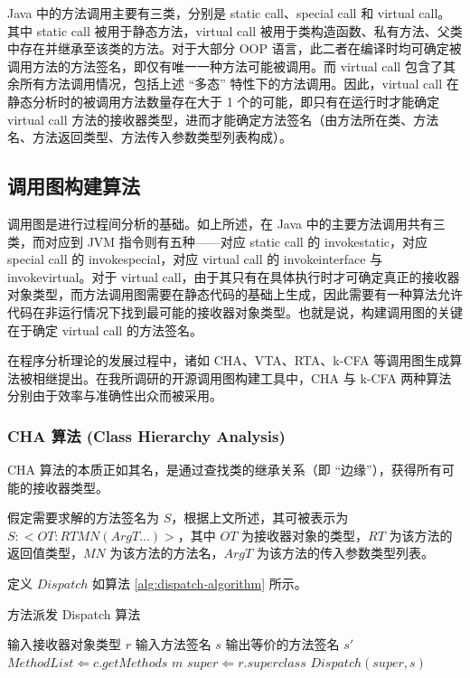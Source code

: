 Java 中的方法调用主要有三类，分别是 static call、special call 和 virtual call。其中 static call 被用于静态方法，virtual call 被用于类构造函数、私有方法、父类中存在并继承至该类的方法。对于大部分 OOP 语言，此二者在编译时均可确定被调用方法的方法签名，即仅有唯一一种方法可能被调用。而 virtual call 包含了其余所有方法调用情况，包括上述 “多态” 特性下的方法调用。因此，virtual call 在静态分析时的被调用方法数量存在大于 1 个的可能，即只有在运行时才能确定 virtual call 方法的接收器类型，进而才能确定方法签名（由方法所在类、方法名、方法返回类型、方法传入参数类型列表构成）。

\subsection{调用图构建算法}

调用图是进行过程间分析的基础。如上所述，在 Java 中的主要方法调用共有三类，而对应到 JVM 指令则有五种——对应 static call 的 invokestatic，对应 special call 的 invokespecial，对应 virtual call 的 invokeinterface 与 invokevirtual。对于 virtual call，由于其只有在具体执行时才可确定真正的接收器对象类型，而方法调用图需要在静态代码的基础上生成，因此需要有一种算法允许代码在非运行情况下找到最可能的接收器对象类型。也就是说，构建调用图的关键在于确定 virtual call 的方法签名。

在程序分析理论的发展过程中，诸如 CHA、VTA、RTA、k-CFA 等调用图生成算法被相继提出。在我所调研的开源调用图构建工具中，CHA 与 k-CFA 两种算法分别由于效率与准确性出众而被采用。

\subsubsection{CHA 算法 (Class Hierarchy Analysis)}

CHA 算法的本质正如其名，是通过查找类的继承关系（即 “边缘”），获得所有可能的接收器类型。

假定需要求解的方法签名为 $S$，根据上文所述，其可被表示为 $S: <OT: RT MN(ArgT...)>$，其中 $OT$ 为接收器对象的类型，$RT$ 为该方法的返回值类型，$MN$ 为该方法的方法名，$ArgT$ 为该方法的传入参数类型列表。

定义 $Dispatch$ 如算法 \ref{alg:dispatch-algorithm} 所示。

\renewcommand{\thealgorithm}{5}
    \begin{algorithm}
        \caption{方法派发 Dispatch 算法}
        \begin{algorithmic}[1]
            \Require 输入接收器对象类型 $r$
            \Require 输入方法签名 $s$
            \Ensure 输出等价的方法签名 $s'$
            \State $MethodList \Leftarrow c.getMethods$
                    \State \Return $m$
                \EndIf
            \EndFor
            \State $super \Leftarrow r.superclass$
            \State \Return $Dispatch(super, s)$
        \end{algorithmic}
        \label{alg:dispatch-algorithm}
    \end{algorithm}

